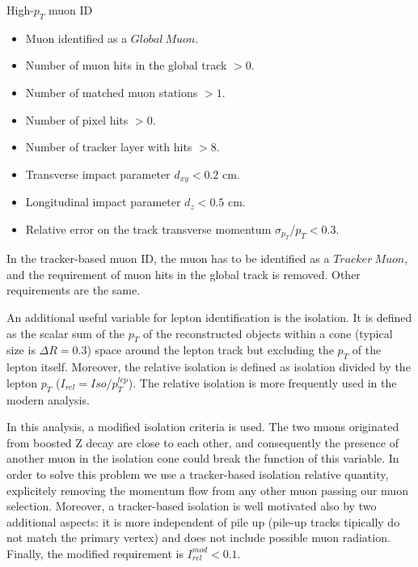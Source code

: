 High-$p_{T}$ muon ID
\begin{itemize}
\item Muon identified as a $Global~Muon$.
\item Number of muon hits in the global track $> 0$.
\item Number of matched muon stations $> 1$.
\item Number of pixel hits $> 0$.
\item Number of tracker layer with hits $> 8$.
\item Transverse impact parameter $d_{xy} < 0.2$ cm.
\item Longitudinal impact parameter $d_{z} < 0.5$ cm.
\item Relative error on the track transverse momentum $\sigma_{p_{T}}/p_{T} < 0.3$.\\
\end{itemize}

In the tracker-based muon ID, the muon has to be identified as a $Tracker~Muon$, and the requirement of muon hits in the global track is removed. Other requirements are the same.

An additional useful variable for lepton identification is the isolation. It is defined as the scalar sum of the $p_{T}$ of the reconstructed objects within a cone (typical size is $\Delta R=0.3$) space around the lepton track but excluding the $p_{T}$ of the lepton itself. Moreover, the relative isolation is defined as isolation divided by the lepton $p_{T}$ ($I_{rel} = Iso/p_{T}^{lep}$). The relative isolation is more frequently used in the modern analysis.

In this analysis, a modified isolation criteria is used. The two muons originated from boosted Z decay are close to each other, and consequently the presence of another muon in the isolation cone could break the function of this variable. In order to solve this problem we use a tracker-based isolation relative quantity, explicitely removing the momentum flow from any other muon passing our muon selection. Moreover, a tracker-based isolation is well motivated also by two additional aspects: it is more independent of pile up (pile-up tracks tipically do not match the primary vertex) and does not include possible muon radiation. Finally, the modified requirement is $I_{rel}^{mod} < 0.1$.\\

